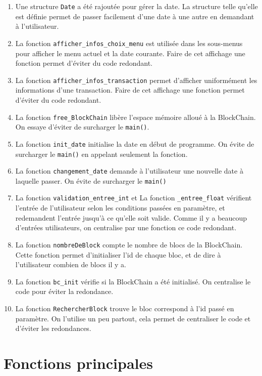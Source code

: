 \documentclass[
	12pt, %
]{fphw}
\begin{document}
\begin{enumerate}
	\item Une structure \texttt{Date} a été rajoutée pour gérer la date. La structure telle qu'elle est définie permet de passer facilement d'une date à une autre en demandant à l'utilisateur.
	\item La fonction \texttt{afficher\_infos\_choix\_menu} est utilisée dans les sous-menus pour afficher le menu actuel et la date courante. Faire de cet affichage une fonction permet d'éviter du code redondant.
	\item La fonction \texttt{afficher\_infos\_transaction} permet d'afficher uniformément les informations d'une transaction. Faire de cet affichage une fonction permet d'éviter du code redondant.
	\item La fonction \texttt{free\_BlockChain} libère l'espace mémoire alloué à la BlockChain. On essaye d'éviter de surcharger le \texttt{main()}.
	\item La fonction \texttt{init\_date} initialise la date en début de programme. On évite de surcharger le \texttt{main()} en appelant seulement la fonction.
	\item La fonction \texttt{changement\_date} demande à l'utilisateur une nouvelle date à laquelle passer. On évite de surcharger le \texttt{main()}	\item La fonction \texttt{validation\_entree\_int} et La fonction \texttt{\_entree\_float} vérifient l'entrée de l'utilisateur selon les conditions passées en paramètre, et redemandent l'entrée jusqu'à ce qu'elle soit valide. Comme il y a beaucoup d'entrées utilisateurs, on centralise par une fonction ce code redondant.
	\item La fonction \texttt{nombreDeBlock} compte le nombre de blocs de la BlockChain. Cette fonction permet d'initialiser l'id de chaque bloc, et de dire à l'utilisateur combien de blocs il y a.
	\item La fonction \texttt{bc\_init} vérifie si la BlockChain a été initialisé. On centralise le code pour éviter la redondance. 
	\item La fonction \texttt{RechercherBlock} trouve le bloc correspond à l'id passé en paramètre. On l'utilise un peu partout, cela permet de centraliser le code et d'éviter les redondances.
\end{enumerate}
\section*{Fonctions principales}
\end{document}

